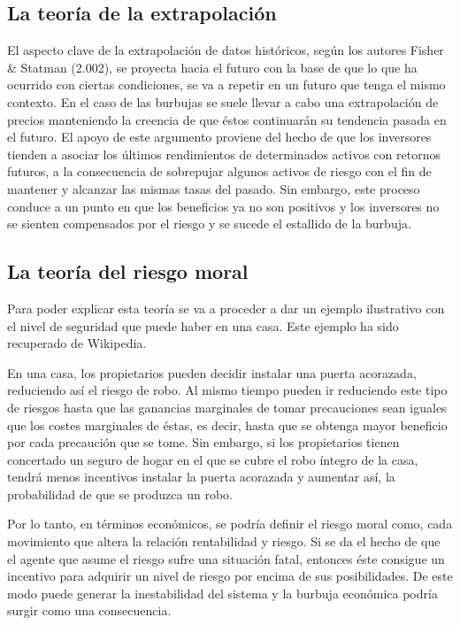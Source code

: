 \subsection{La teoría de la extrapolación} 

El aspecto clave de la extrapolación de datos históricos, según los autores Fisher  \& Statman (2.002), se proyecta hacia el futuro con la base de que lo que ha ocurrido con ciertas condiciones, se va a repetir en un futuro que tenga el mismo contexto. En el caso de las burbujas se suele llevar a cabo una extrapolación de precios manteniendo la creencia de que  éstos continuarán su tendencia pasada en el futuro. El apoyo de este argumento proviene del hecho de que los inversores tienden a asociar los últimos rendimientos de determinados activos con retornos futuros, a la consecuencia de sobrepujar algunos activos de riesgo con el fin de mantener y alcanzar las mismas tasas del pasado. Sin embargo, este proceso conduce a un punto en que los beneficios ya no son positivos y los inversores no se sienten compensados  por el riesgo y se sucede el estallido de la burbuja.

\subsection{La teoría del riesgo moral}

Para poder explicar esta teoría se va a proceder a dar un ejemplo ilustrativo con el nivel de seguridad que puede haber en una casa. Este ejemplo ha sido recuperado de Wikipedia.

En una casa, los propietarios pueden decidir instalar una puerta acorazada, reduciendo así el riesgo de robo. Al mismo tiempo pueden ir reduciendo este tipo de riesgos hasta que las ganancias marginales de tomar precauciones sean iguales que los costes marginales de éstas, es decir, hasta que se obtenga mayor beneficio por cada precaución que se tome. Sin embargo, si los propietarios tienen concertado un seguro de hogar en el que se cubre el robo íntegro de la casa, tendrá menos incentivos instalar la puerta acorazada y aumentar así, la probabilidad de que se produzca un robo. 

Por lo tanto, en términos económicos, se podría definir el riesgo moral como, cada movimiento que altera la relación rentabilidad y riesgo. Si se da el hecho de que el agente que asume el riesgo sufre una situación fatal, entonces éste consigue un incentivo para adquirir un nivel de riesgo por encima de sus posibilidades. De este modo puede generar la inestabilidad del sistema y la burbuja económica podría surgir como una consecuencia.



